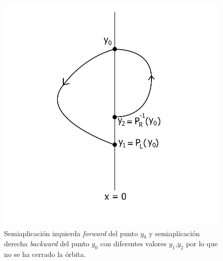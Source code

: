 \documentclass[12pt,a4paper]{report} %
\begin{document}
	\begin{figure}[h]
		\centering
		\includegraphics[width=1\textwidth]{aplipoincareL-R.jpg}
		\caption{Semiaplicación izquierda \textit{forward} del punto $y_0$ y semiaplicación derecha \textit{backward} del punto $y_0$ con diferentes valores $y_1$,$y_2$ por lo que no se ha cerrado la órbita.}
		\label{fig:aplipoincareL-R}
	\end{figure}\smallskip
	
	\newpage
	
\end{document}
